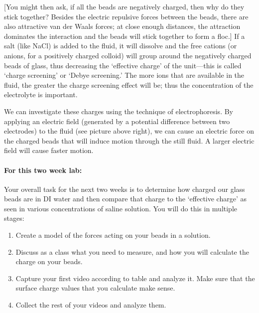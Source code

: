 [You might then ask, if all the beads are negatively charged, then why do they stick together? 
Besides the electric repulsive forces between the beads, there are also attractive van der Waals forces; at close enough distances, the attraction dominates the interaction and the beads will stick together to form a floc.] 
If a salt (like NaCl) is added to the fluid, it will dissolve and the free cations (or anions, for a positively charged colloid) will group around the negatively charged beads of glass, thus decreasing the `effective charge' of the unit—this is called `charge screening' or `Debye screening.' 
The more ions that are available in the fluid, the greater the charge screening effect will be; thus the concentration of the electrolyte is important.
\par 
We can investigate these charges using the technique of electrophoresis. 
By applying an electric field (generated by a potential difference between two electrodes) to the fluid (see picture above right), we can cause an electric force on the charged beads that will induce motion through the still fluid.
A larger electric field will cause faster motion. 

\paragraph{For this two week lab:} Your overall task for the next two weeks is to determine how charged our glass beads are in DI water and then compare that charge to the `effective charge' as seen in various concentrations of saline solution.
You will do this in multiple stages:
\begin{enumerate}
\itemsep-0.5em
\item Create a model of the forces acting on your beads in a solution.
\item Discuss as a class what you need to measure, and how you will calculate the charge on your beads.
\item Capture your first video according to table and analyze it. Make sure that the surface charge values that you calculate make sense.
\item Collect the rest of your videos and analyze them.
\end{enumerate}

